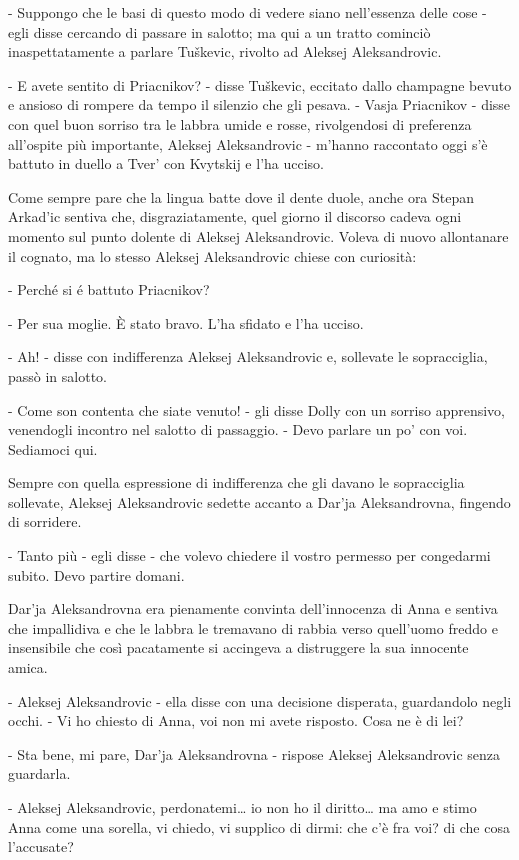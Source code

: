 - Suppongo che le basi di questo modo di vedere siano nell'essenza delle cose - egli disse cercando di passare in salotto; ma qui a un tratto cominciò inaspettatamente a parlare Tuškevic, rivolto ad Aleksej Aleksandrovic. 

- E avete sentito di Priacnikov? - disse Tuškevic, eccitato dallo champagne bevuto e ansioso di rompere da tempo il silenzio che gli pesava. - Vasja Priacnikov - disse con quel buon sorriso tra le labbra umide e rosse, rivolgendosi di preferenza all'ospite più importante, Aleksej Aleksandrovic - m'hanno raccontato oggi s'è battuto in duello a Tver' con Kvytskij e l'ha ucciso. 

Come sempre pare che la lingua batte dove il dente duole, anche ora Stepan Arkad'ic sentiva che, disgraziatamente, quel giorno il discorso cadeva ogni momento sul punto dolente di Aleksej Aleksandrovic. Voleva di nuovo allontanare il cognato, ma lo stesso Aleksej Aleksandrovic chiese con curiosità: 

- Perché si é battuto Priacnikov? 

- Per sua moglie. È stato bravo. L'ha sfidato e l'ha ucciso. 

- Ah! - disse con indifferenza Aleksej Aleksandrovic e, sollevate le sopracciglia, passò in salotto. 

- Come son contenta che siate venuto! - gli disse Dolly con un sorriso apprensivo, venendogli incontro nel salotto di passaggio. - Devo parlare un po' con voi. Sediamoci qui. 

Sempre con quella espressione di indifferenza che gli davano le sopracciglia sollevate, Aleksej Aleksandrovic sedette accanto a Dar'ja Aleksandrovna, fingendo di sorridere. 

- Tanto più - egli disse - che volevo chiedere il vostro permesso per congedarmi subito. Devo partire domani. 

Dar'ja Aleksandrovna era pienamente convinta dell'innocenza di Anna e sentiva che impallidiva e che le labbra le tremavano di rabbia verso quell'uomo freddo e insensibile che così pacatamente si accingeva a distruggere la sua innocente amica. 

- Aleksej Aleksandrovic - ella disse con una decisione disperata, guardandolo negli occhi. - Vi ho chiesto di Anna, voi non mi avete risposto. Cosa ne è di lei? 

- Sta bene, mi pare, Dar'ja Aleksandrovna - rispose Aleksej Aleksandrovic senza guardarla. 

- Aleksej Aleksandrovic, perdonatemi\ldots{} io non ho il diritto\ldots{} ma amo e stimo Anna come una sorella, vi chiedo, vi supplico di dirmi: che c'è fra voi? di che cosa l'accusate? 

